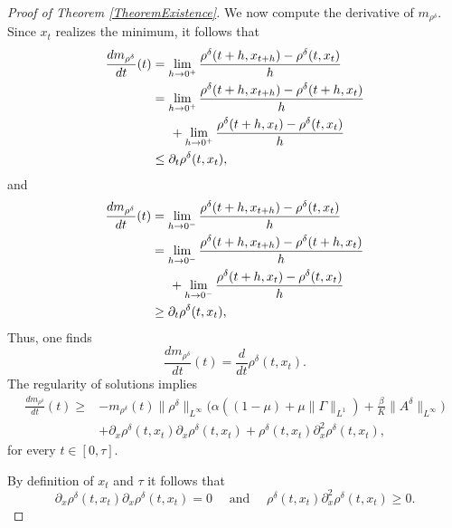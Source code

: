 \documentclass[12pt]{amsart}
\begin{document}
\begin{proof}[Proof of Theorem \ref{TheoremExistence}]
We now compute the derivative of $m_{\rho^\delta}$. Since $x_t$ realizes the minimum, it follows that
	\begin{equation*}
		\begin{split}
			\frac{d m_{\rho^\delta}}{dt}(t)&=\lim_{h\to 0^+}\frac{\rho^\delta(t+h,x_{t+h})-\rho^\delta(t,x_{t})}{h}\\
			&=\lim_{h\to 0^+}\frac{\rho^\delta(t+h,x_{t+h})-\rho^\delta(t+h,x_{t})}{h}\\
            &\hspace{0.5cm}+\lim_{h\to 0^+}\frac{\rho^\delta(t+h,x_{t})-\rho^\delta(t,x_{t})}{h}\\
			&\leq \partial_t \rho^\delta (t,x_t),
		\end{split}
	\end{equation*} 
	and 
	\begin{equation*}
		\begin{split}
			\frac{d m_{\rho^\delta}}{dt}(t)&=\lim_{h\to 0^-}\frac{\rho^\delta(t+h,x_{t+h})-\rho^\delta(t,x_{t})}{h}\\
			&=\lim_{h\to 0^-}\frac{\rho^\delta(t+h,x_{t+h})-\rho^\delta(t+h,x_{t})}{h}\\
            &\hspace{0.5cm}+\lim_{h\to 0^-}\frac{\rho^\delta(t+h,x_{t})-\rho^\delta(t,x_{t})}{h}\\
			&\geq \partial_t \rho^\delta (t,x_t),
		\end{split}
	\end{equation*}
	Thus, one  finds
	\begin{equation}\label{Derivativem}
		\frac{d m_{\rho^\delta}}{dt}(t)=\frac{d}{dt} \rho^\delta (t,x_t).
	\end{equation}
	The regularity of solutions implies
	\begin{equation}\label{Positive}
		\begin{split}
			\frac{d m_{\rho^\delta} }{dt}(t)\geq& -m_{\rho^\delta}(t)\|\rho^\delta\|_{L^\infty}\Big( \alpha((1-\mu)+\mu\|\Gamma\|_{L^1})+\frac{\beta}{K}\|A^\delta\|_{L^\infty}  \Big)\\
			&+\partial_{x}\rho^\delta(t,x_t)\partial_{x}\rho^\delta(t,x_t)+\rho^\delta(t,x_t)\partial_{x}^2\rho^\delta(t,x_t),
		\end{split}
	\end{equation}
	for every $t\in[0,\tau]$.
	
	By definition of $x_t$ and $\tau$ it follows that
	\begin{equation*}
		\partial_{x}\rho^\delta(t,x_t)\partial_{x}\rho^\delta(t,x_t)=0\quad \text{ and } \quad\rho^\delta(t,x_t)\partial_{x}^2\rho^\delta(t,x_t)\geq 0.
	\end{equation*}
	

\end{proof}
\end{document}
